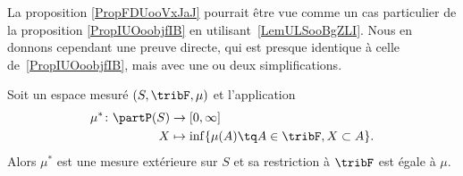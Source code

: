 \begin{normaltext}
	La proposition \ref{PropFDUooVxJaJ} pourrait être vue comme un cas particulier de la proposition \ref{PropIUOoobjfIB} en utilisant~\ref{LemULSooBgZLI}. Nous en donnons cependant une preuve directe, qui est presque identique à celle de~\ref{PropIUOoobjfIB}, mais avec une ou deux simplifications.
\end{normaltext}

\begin{proposition}    \label{PropFDUooVxJaJ}
	Soit un espace mesuré \( (S,\tribF,\mu)\) et l'application
	\begin{equation}
		\begin{aligned}
			\mu^*\colon \partP(S) & \to \mathopen[ 0 , \infty \mathclose]              \\
			X                     & \mapsto \inf\{ \mu(A)\tq A\in\tribF,X\subset A \}.
		\end{aligned}
	\end{equation}
	Alors \( \mu^*\) est une mesure extérieure sur \( S\) et sa restriction à \( \tribF\) est égale à \( \mu\).
\end{proposition}

